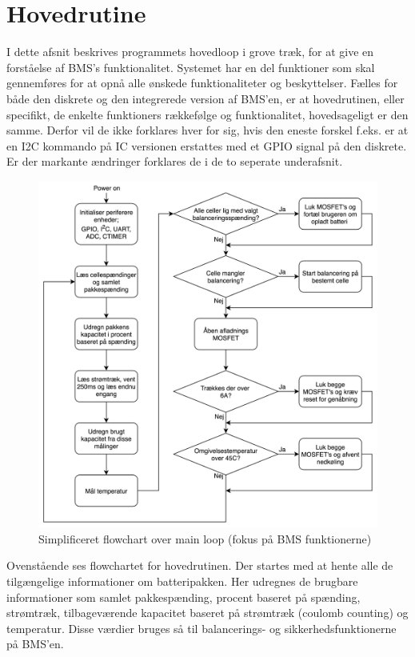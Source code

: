 \section{Hovedrutine}
I dette afsnit beskrives programmets hovedloop i grove træk, for at give en forståelse af BMS's funktionalitet. Systemet har en del funktioner som skal gennemføres for at opnå alle ønskede funktionaliteter og beskyttelser. Fælles for både den diskrete og den integrerede version af BMS'en, er at hovedrutinen, eller specifikt, de enkelte funktioners rækkefølge og funktionalitet, hovedsageligt er den samme. Derfor vil de ikke forklares hver for sig, hvis den eneste forskel f.eks. er at en I2C kommando på IC versionen erstattes med et GPIO signal på den diskrete. Er der markante ændringer forklares de i de to seperate underafsnit.

\begin{figure}[h]
	\centering
	\includegraphics[width=15cm]{billeder/main_loop_bms_functions.png}
	\caption{Simplificeret flowchart over main loop (fokus på BMS funktionerne)}
	\label{fig:main_loop}
\end{figure}

Ovenstående ses flowchartet for hovedrutinen. Der startes med at hente alle de tilgængelige informationer om batteripakken. Her udregnes de brugbare informationer som samlet pakkespænding, procent baseret på spænding, strømtræk, tilbageværende kapacitet baseret på strømtræk (coulomb counting) og temperatur. Disse værdier bruges så til balancerings- og sikkerhedsfunktionerne på BMS'en. \\

